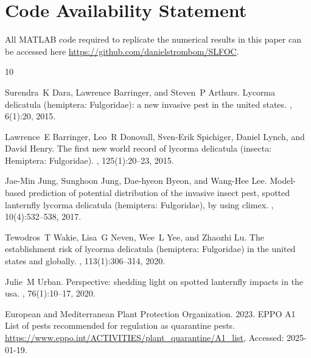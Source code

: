 \documentclass[onecolumn]{article}
\providecommand{\uppercase}[1]{\MakeUppercase{#1}}
\begin{document}
\section*{Code Availability Statement}{All MATLAB code required to replicate the numerical results in this paper can be accessed here \url{https://github.com/danielstrombom/SLFOC}.






%
\begin{thebibliography}{10}

Surendra~K Dara, Lawrence Barringer, and Steven~P Arthurs.
\newblock Lycorma delicatula (hemiptera: Fulgoridae): a new invasive pest in the united states.
, 6(1):20, 2015.

Lawrence~E Barringer, Leo~R Donovall, Sven-Erik Spichiger, Daniel Lynch, and David Henry.
\newblock The first new world record of lycorma delicatula (insecta: Hemiptera: Fulgoridae).
, 125(1):20--23, 2015.

Jae-Min Jung, Sunghoon Jung, Dae-hyeon Byeon, and Wang-Hee Lee.
\newblock Model-based prediction of potential distribution of the invasive insect pest, spotted lanternfly lycorma delicatula (hemiptera: Fulgoridae), by using climex.
, 10(4):532--538, 2017.

Tewodros~T Wakie, Lisa~G Neven, Wee~L Yee, and Zhaozhi Lu.
\newblock The establishment risk of lycorma delicatula (hemiptera: Fulgoridae) in the united states and globally.
, 113(1):306--314, 2020.

Julie~M Urban.
\newblock Perspective: shedding light on spotted lanternfly impacts in the usa.
, 76(1):10--17, 2020.

\uppercase{E}uropean and \uppercase{M}editerranean \uppercase{P}lant \uppercase{P}rotection \uppercase{O}rganization. 2023. \uppercase{EPPO A1} \uppercase{L}ist of pests recommended for regulation as quarantine pests.
\newblock \url{https://www.eppo.int/ACTIVITIES/plant\_quarantine/A1\_list}, {Accessed: 2025-01-19.}


\end{thebibliography}}
\end{document}

